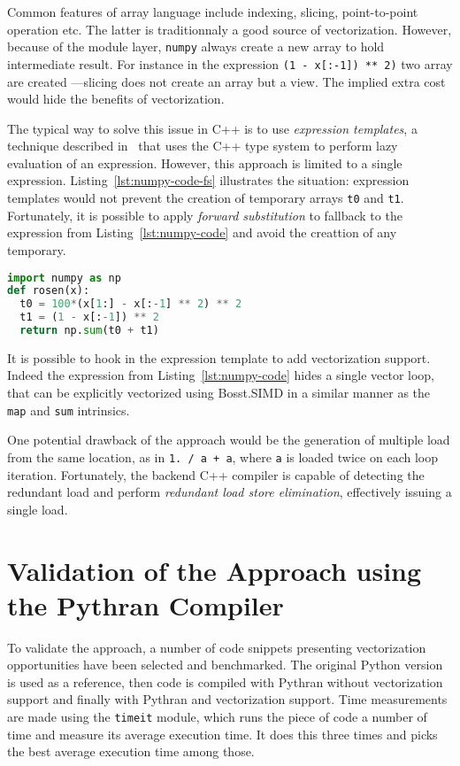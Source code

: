\documentclass[preprint]{sigplanconf}
\begin{document}
Common features of array language include indexing, slicing, point-to-point
operation etc. The latter is traditionnaly a good source of vectorization.
However, because of the module layer, \texttt{numpy} always create a new array
to hold intermediate result. For instance in the expression \texttt{(1 -
x[:-1]) ** 2)} two array are created ---slicing does not create an array but a
view. The implied extra cost would hide the benefits of vectorization.

The typical way to solve this issue in C++ is to use \emph{expression
templates}, a technique described in~\cite{} that uses the C++ type system to
perform lazy evaluation of an expression. However, this approach is limited to
a single expression. Listing~\ref{lst:numpy-code-fs} illustrates the situation:
expression templates would not prevent the creation of temporary arrays
\texttt{t0} and \texttt{t1}. Fortunately, it is possible to apply \emph{forward
substitution} to fallback to the expression from Listing~\ref{lst:numpy-code}
and avoid the creattion of any temporary.

\begin{lstlisting}[language=python, label={lst:numpy-code-fs}, caption={Sample \texttt{numpy} code requiring forward subsitution.}]
import numpy as np
def rosen(x):
  t0 = 100*(x[1:] - x[:-1] ** 2) ** 2
  t1 = (1 - x[:-1]) ** 2
  return np.sum(t0 + t1)
\end{lstlisting}

It is possible to hook in the expression template to add vectorization support.
Indeed the expression from Listing~\ref{lst:numpy-code} hides a single vector
loop, that can be explicitly vectorized using Bosst.SIMD in a similar manner as
the \texttt{map} and \texttt{sum} intrinsics.

One potential drawback of the approach would be the generation of multiple load
from the same location, as in \texttt{1. / a + a}, where \texttt{a} is loaded
twice on each loop iteration. Fortunately, the backend C++ compiler is capable
of detecting the redundant load and perform \emph{redundant load store
elimination}, effectively issuing a single load.

\section{Validation of the Approach using the Pythran Compiler}
\label{sec:benchs}

To validate the approach, a number of code snippets presenting vectorization
opportunities have been selected and benchmarked. The original Python version
is used as a reference, then code is compiled with Pythran without
vectorization support and finally with Pythran and vectorization support. Time
measurements are made using the \texttt{timeit} module, which runs the piece of
code a number of time and measure its average execution time. It does this
three times and picks the best average execution time among those.
\end{document}
